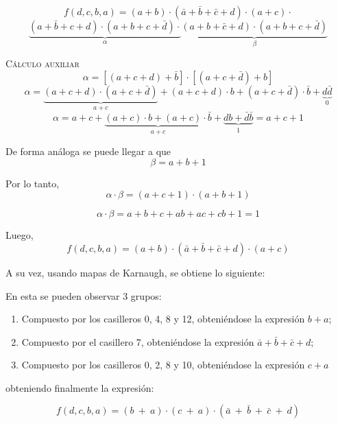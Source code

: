 \documentclass[a4paper]{article}
\begin{document}
\begin{center}
\[
	f \left( d,c,b,a \right) = \left( a + b \right) \cdot \left( \bar{a} + \bar{b} + \bar{c} + d \right) \cdot 
	\left( a + c \right) \cdot
\]
\[
	\underbrace{\left( a + \bar{b} + c + d\right) \cdot \left( a + b + c + \bar{d} \right)\cdot}_{\alpha}
	\underbrace{\left( a + b + \bar{c} + d \right) \cdot \left( a + b + c + \bar{d} \right)}_{\beta}
\]

\textsc{Cálculo auxiliar}
\[
	\alpha = \left[ \left( a + c + d \right) + \bar{b} \right] \cdot 
	\left[ \left( a + c + \bar{d} \right) + b \right]  
\]
\[
	\alpha = \underbrace{\left( a + c + d \right) \cdot \left( a + c + \bar{d} \right)}_{a + c}
	+ \left( a + c + d \right) \cdot b + \left( a + c + \bar{d} \right) \cdot \bar{b} +
	\underbrace{d \bar{d}}_{0}	
\]
\[
	\alpha = a + c + \underbrace{\left( a + c \right) \cdot b + \left( a + c \right) \cdot \bar{b}}_{a + c} 
	+ \underbrace{db + \bar{d}\bar{b}}_{1}	= a + c + 1
\]

De forma análoga se puede llegar a que
\[	\beta = a + b + 1 \]

Por lo tanto,
\[
	\alpha \cdot \beta = \left( a + c + 1 \right) \cdot \left( a + b + 1 \right)
\]

\[
	\alpha \cdot \beta = a + b + c + ab + ac + cb + 1 = 1
\]

Luego,
\begin{equation}
f \left( d,c,b,a \right) = \left( a + b \right) \cdot \left( \bar{a} + \bar{b} + \bar{c} + d \right) \cdot 
	\left( a + c \right)
	\label{equ:boolmax}
\end{equation}

A su vez, usando mapas de Karnaugh, se obtiene lo siguiente:

\end{center}


En esta se pueden observar 3 grupos:
\begin{enumerate}
	\item Compuesto por los casilleros 0, 4, 8 y 12, obteniéndose la expresión $ b + a $;
	\item Compuesto por el casillero 7, obteniéndose la expresión $ \bar{a} + \bar{b} + \bar{c} + d $;
	\item Compuesto por los casilleros 0, 2, 8 y 10, obteniéndose la expresión $ c + a $
\end{enumerate}

obteniendo finalmente la expresión: 

\begin{equation}
	f \left( d,c,b,a \right) = \left( b \ + \ a \right) \cdot \left( c \ + \ a \right) \cdot \left( \bar{a} \ + \ \bar{b} \ + \ \bar{c} \ + \ d \right)
\end{equation}
\end{document}
